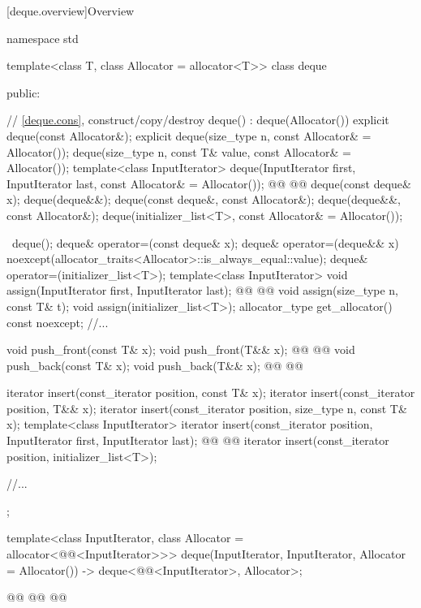 \documentclass{wg21}
\begin{document}
[deque.overview]{Overview}
\begin{codeblock}
namespace std {
    template<class T, class Allocator = allocator<T>>
    class deque {
        public:

        // \ref{deque.cons}, construct/copy/destroy
        deque() : deque(Allocator()) { }
        explicit deque(const Allocator&);
        explicit deque(size_type n, const Allocator& = Allocator());
        deque(size_type n, const T& value, const Allocator& = Allocator());
        template<class InputIterator>
        deque(InputIterator first, InputIterator last, const Allocator& = Allocator());
        @@
        @@
        deque(const deque& x);
        deque(deque&&);
        deque(const deque&, const Allocator&);
        deque(deque&&, const Allocator&);
        deque(initializer_list<T>, const Allocator& = Allocator());

        ~deque();
        deque& operator=(const deque& x);
        deque& operator=(deque&& x)
        noexcept(allocator_traits<Allocator>::is_always_equal::value);
        deque& operator=(initializer_list<T>);
        template<class InputIterator>
        void assign(InputIterator first, InputIterator last);
        @@
        @@
        void assign(size_type n, const T& t);
        void assign(initializer_list<T>);
        allocator_type get_allocator() const noexcept;
        //...

        void push_front(const T& x);
        void push_front(T&& x);
        @@
        @@
        void push_back(const T& x);
        void push_back(T&& x);
        @@
        @@


        iterator insert(const_iterator position, const T& x);
        iterator insert(const_iterator position, T&& x);
        iterator insert(const_iterator position, size_type n, const T& x);
        template<class InputIterator>
        iterator insert(const_iterator position, InputIterator first, InputIterator last);
        @@
        @@
        iterator insert(const_iterator position, initializer_list<T>);

        //...
    };

    template<class InputIterator, class Allocator = allocator<@@<InputIterator>>>
    deque(InputIterator, InputIterator, Allocator = Allocator())
    -> deque<@@<InputIterator>, Allocator>;

    @@
    @@
    @@
}
\end{codeblock}
\end{document}
